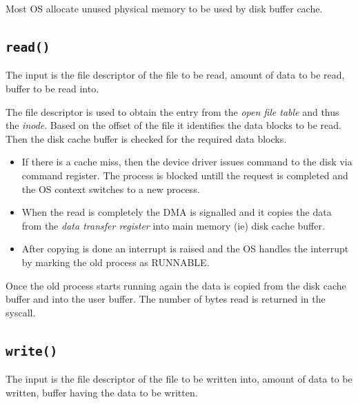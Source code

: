 \documentclass[12pt]{article}
\begin{document}
Most OS allocate unused physical memory to be used by disk buffer cache. 


\subsection{\texttt{read()}}
The input is the file descriptor of the file to be read, amount of data to be read, buffer to be read into. 

The file descriptor is used to obtain the entry from the \textit{open file table} and thus the \textit{inode}. Based on the offset of the file it identifies the data blocks to be read. 
Then the disk cache buffer is checked for the required data blocks. 
\begin{itemize}[itemsep = 0cm, topsep = 0cm, parsep = 0cm]
    \item If there is a cache miss, then the device driver issues command to the disk via command register. The process is blocked untill the request is completed and the OS context switches to a new process. 
    \item When the read is completely the DMA is signalled and it copies the data from the \textit{data transfer register} into main memory (ie) disk cache buffer. 
    \item After copying is done an interrupt is raised and the OS handles the interrupt by marking the old process as RUNNABLE.   
\end{itemize}

Once the old process starts running again the data is copied from the disk cache buffer and into the user buffer. The number of bytes read is returned in the syscall. 

\subsection{\texttt{write()}}
The input is the file descriptor of the file to be written into, amount of data to be written, buffer having the data to be written. 
\end{document}
